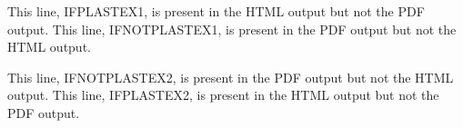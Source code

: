 \documentclass{article}
\begin{document}
\ifplastex
    This line, IFPLASTEX1, is present in the HTML output but not the PDF output.
\else
    This line, IFNOTPLASTEX1, is present in the PDF output but not the HTML output.
\fi

\ifpdflatex
    This line, IFNOTPLASTEX2, is present in the PDF output but not the HTML output.
\else
    This line, IFPLASTEX2, is present in the HTML output but not the PDF output.
\fi
\end{document}

